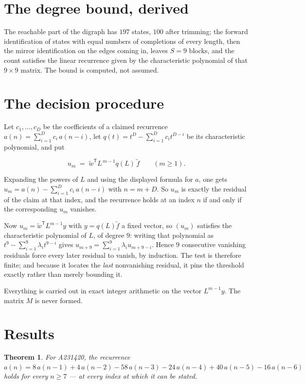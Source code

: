 \documentclass[11pt]{article}
\newtheorem{theorem}{Theorem}
\theoremstyle{definition}
\begin{document}
\section{The degree bound, derived}

The reachable part of the digraph has $197$ states, $100$ after trimming; the forward identification of states with equal numbers of completions of every length, then the mirror identification on the edges coming in, leaves $S = 9$ blocks, and the count satisfies the linear recurrence given by the characteristic polynomial of that $9\times9$ matrix. The bound is computed, not assumed.

\section{The decision procedure}

Let $c_1,\dots,c_D$ be the coefficients of a claimed recurrence $a(n) = \sum_{i=1}^{D} c_i\,a(n-i)$, let $q(t) = t^{D} - \sum_{i=1}^{D} c_i t^{D-i}$ be its characteristic polynomial, and put

\[u_m \;=\; \tilde w^{\mathsf T} L^{\,m-1} q(L)\,\tilde f \qquad (m \ge 1).\]

Expanding the powers of $L$ and using the displayed formula for $a$, one gets $u_m = a(n) - \sum_{i=1}^{D} c_i\,a(n-i)$ with $n = m + D$. So $u_m$ is exactly the residual of the claim at that index, and the recurrence holds at an index $n$ if and only if the corresponding $u_m$ vanishes.

Now $u_m = \tilde w^{\mathsf T} L^{m-1} y$ with $y = q(L)\tilde f$ a fixed vector, so $(u_m)$ satisfies the characteristic polynomial of $L$, of degree $9$: writing that polynomial as $t^{9} - \sum_{i=1}^{9} \lambda_i t^{9-i}$ gives $u_{m+9} = \sum_{i=1}^{9} \lambda_i u_{m+9-i}$. Hence $9$ consecutive vanishing residuals force every later residual to vanish, by induction. The test is therefore finite; and because it locates the {\itshape last} nonvanishing residual, it pins the threshold exactly rather than merely bounding it.

Everything is carried out in exact integer arithmetic on the vector $L^{m-1}y$. The matrix $M$ is never formed.

\section{Results}

\begin{theorem} For A231420, the recurrence $a(n) = 8\,a(n-1) + 4\,a(n-2) - 58\,a(n-3) - 24\,a(n-4) + 40\,a(n-5) - 16\,a(n-6)$ holds for every $n \ge 7$ --- at every index at which it can be stated.\end{theorem}
\end{document}

